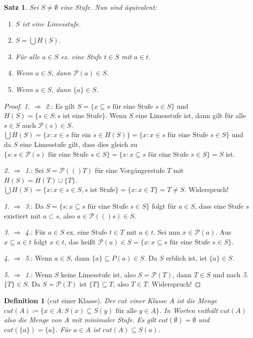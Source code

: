 \documentclass[german]{article}
\theoremstyle{break}
\theoremstyle{def_style}
\newtheorem{definition}{Definition}[section]
\theoremstyle{def_style}
\newtheorem{satz}{Satz}[section]
\theoremstyle{lemma_style}
\newcommand{\Pot}[1]{\mathcal{P}(#1)}
\begin{document}
\begin{satz}
	Sei $S\neq \emptyset$ eine Stufe. Nun sind äquivalent:
	\begin{enumerate}
		\item $S$ ist eine Limesstufe.
		\item $S=\bigcup H(S)$.
		\item Für alle $a\in S$ ex. eine Stufe $t\in S$ mit $a\in t$.
		\item Wenn $a\in S$, dann $\Pot{a}\in S$.
		\item Wenn $a\in S$, dann $\{a\}\in S$.
	\end{enumerate}
\end{satz}
\begin{proof}
	\textit{1. $\Rightarrow$ 2.}: Es gilt $S=\{x \subseteq s \text{ für eine Stufe } s\in S\}$ und $H(S)=\{s\in S : s\text{ ist eine Stufe}\}$. Wenn $S$ eine Limesstufe ist, dann gilt für alle $s\in S$ auch $\Pot{s}\in S$. $\bigcup H(S)=\{x : x\in s \text{ für ein } s \in H(S)\}=\{x : x\in s \text{ für eine Stufe } s\in S\}$ und da $S$ eine Limesstufe gilt, dass dies gleich zu $\{s : s \in \Pot{s} \text{ für eine Stufe } s \in S\}=\{x : x \subseteq s \text{ für eine Stufe } s\in S\}=S$ ist.
	
	\textit{2. $\Rightarrow$ 1.}: Sei $S=\Pot(T)$ für eine Vorgängerstufe $T$ mit $H(S)=H(T)\cup \{T\}$. $\bigcup H(S)=\{x : x \in s \in S, s \text{ ist Stufe}\} = \{x : x \in T\}=T\neq S$. Widerspruch!
	
	\textit{1. $\Rightarrow$ 3.}: Da $S=\{s: x\subseteq s \text{ für eine Stufe } s \in S\}$ folgt für $a\in S$, dass eine Stufe $s$ existiert mit $a\subset s$, also $a\in \Pot(s)\in S$.
	
	\textit{3. $\Rightarrow$ 4.}: Für $a\in S$ ex. eine Stufe $t\in T$ mit $a\in t$. Sei nun $x\in \Pot{a}$. Aus $x\subseteq a \in t$ folgt $x\in t$, das heißt $\Pot{a}\in S=\{x : x\subseteq s \text{ für eine Stufe } s\in S\}$.
	
	\textit{4. $\Rightarrow$ 5.}: Wenn $a\in S$, dann $\{a\}\subseteq P(a)\in S$. Da $S$ erblich ist, ist $\{a\}\in S$.
	
	\textit{5. $\Rightarrow$ 1.}: Wenn $S$ keine Limesstufe ist, also $S=\Pot{T}$, dann $T\in S$ und nach \textit{5.} $\{T\}\in S$. Da $S=\Pot{T}$ ist $\{T\}\subseteq T$, also $T\in T$. Widerspruch!
\end{proof}

\begin{definition}[$cut$ einer Klasse]
	Der $cut$ einer Klasse $A$ ist die Menge $cut(A)\coloneqq\{x \in A : S(x)\subseteq S(y) \text{ für alle } y \in A\}$. In Worten enthält $cut(A)$ also die Menge von $A$ mit minimaler Stufe. Es gilt $cut(\emptyset)=\emptyset$ und $cut(\{a\})=\{a\}$. Für $a\in A$ ist $cut(A)\subseteq S(a)$.
\end{definition}
\end{document}
